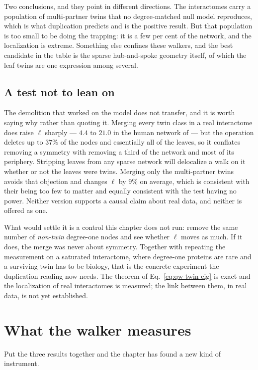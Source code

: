 Two conclusions, and they point in different directions. The interactomes carry a
population of multi-partner twins that no degree-matched null model reproduces, which
is what duplication predicts and is the positive result. But that population is too
small to be doing the trapping: it is a few per cent of the network, and the
localization is extreme. Something else confines these walkers, and the best candidate
in the table is the sparse hub-and-spoke geometry itself, of which the leaf twins are
one expression among several.

\subsection*{A test not to lean on}

The demolition that worked on the model does not transfer, and it is worth saying why
rather than quoting it. Merging every twin class in a real interactome does raise
$\ell$ sharply --- $4.4$ to $21.0$ in the human network of \citet{rual2005} --- but the
operation deletes up to $37\%$ of the nodes and essentially all of the leaves, so it
conflates removing a symmetry with removing a third of the network and most of its
periphery. Stripping leaves from any sparse network will delocalize a walk on it
whether or not the leaves were twins. Merging only the multi-partner twins avoids that
objection and changes $\ell$ by $9\%$ on average, which is consistent with their being
too few to matter and equally consistent with the test having no power. Neither
version supports a causal claim about real data, and neither is offered as one.

What would settle it is a control this chapter does not run: remove the same number of
\emph{non-twin} degree-one nodes and see whether $\ell$ moves as much. If it does, the
merge was never about symmetry. Together with repeating the measurement on a saturated
interactome, where degree-one proteins are rare and a surviving twin has to be
biology, that is the concrete experiment the duplication reading now needs. The
theorem of Eq.~\eqref{eq:qw-twin-eig} is exact and the localization of real
interactomes is measured; the link between them, in real data, is not yet established.


\section{What the walker measures}

Put the three results together and the chapter has found a new kind of instrument.

